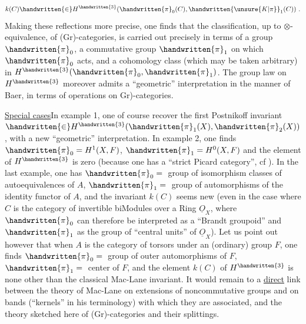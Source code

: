 \[
k(C)\handwritten{\in}H^{\handwritten{3}}(\handwritten{\pi}_{0}(C),\handwritten{\unsure{K|\pi}}_{1}(C))\ .
\]
Making these reflections more precise, one finds that the classification, up to $\otimes$-equivalence, of (Gr)-categories, is carried out precisely in terms of a group $\handwritten{\pi}_{0}$, a commutative group $\handwritten{\pi}_{1}$ on which $\handwritten{\pi}_{0}$ acts, and a cohomology class (which may be taken arbitrary) in $H^{\handwritten{3}}(\handwritten{\pi}_{0},\handwritten{\pi}_{1})$. The  group law on $H^{\handwritten{3}}$ moreover admits a ``geometric'' interpretation in the manner of Baer, in terms of operations on \handwritten{(}Gr)-categories.

\uline{Special cases}\quad In example 1, one  of course recover the first Postnikoff invariant $\handwritten{\in}H^{\handwritten{3}}(\handwritten{\pi}_{1}(X),\handwritten{\pi}_{2}(X))$, with a new ``geo\deleted{(}metric'' interpretation. In example 2, one finds $\handwritten{\pi}_{0}=H^{1}(X,F)$, $\handwritten{\pi}_{1}=H^{0}(X,F)$\handwritten{,} and the element of $H^{\handwritten{3}}$ is zero (because one has a ``strict Picard category'', cf \handwritten{[\, ]}). In  the last example, one has $\handwritten{\pi}_{0}={}$ group of isomorphism classes of autoequivalences of $A$, $\handwritten{\pi}_{1}={}$ group of automorphisms of the identity functor of $A$, and the invariant $k(C)$ seems new (even in the case where $C$ is the category of invertible biModules over a Ring $\underline{O}_{X}$, where $\handwritten{\pi}_{0}$ can therefore be interpreted as a ``Brandt groupoid'' and $\handwritten{\pi}_{1}$ as the group of ``central units'' of $\underline{O}_{X}$). Let us point out however that when $A$ is the category of torsors under an (ordinary) group $F$, one finds  $\handwritten{\pi}_{0}={}$ group of outer automorphisms of $F$, $\handwritten{\pi}_{1}={}$ center of $F$, and the element $k(C)$ of $H^{\handwritten{3}}$ is none other than the classical Mac-Lane invariant. It would remain to  a \uline{direct}  link between the theory of Mac-Lane on extensions of noncommutative groups and on bands (``kernels''\deleted{\unsure{)|,}} in his terminology) with which they are associated, and the theory  sketched here of (Gr)-categories and their splittings.


